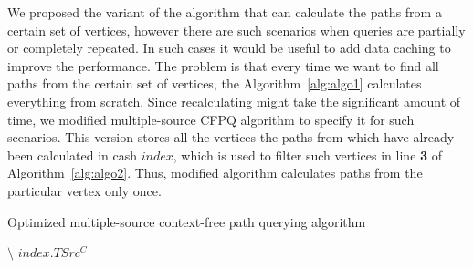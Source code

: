 We proposed the variant of the algorithm that can calculate the paths from a certain set of vertices, however there are such scenarios when queries are partially or completely repeated. In such cases it would be useful to add data caching to improve the performance. The problem is that every time we want to find all paths from the certain set of vertices, the Algorithm~\ref{alg:algo1} calculates everything from scratch. Since recalculating might take the significant amount of time, we modified multiple-source CFPQ algorithm to specify it for such scenarios. This version stores all the vertices the paths from which have already been calculated in cash $index$, which is used to filter such vertices in line \textbf{3} of Algorithm~\ref{alg:algo2}. Thus, modified algorithm calculates paths from the particular vertex only once.
\begin{algorithm}
\begin{algorithmic}[1]
\caption{Optimized multiple-source context-free path querying algorithm}
\label{alg:algo2}

    \EndFor


             $\setminus$ $index.TSrc^C$
        \EndFor
    \EndWhile
\EndFunction


\end{algorithmic}
\end{algorithm}

